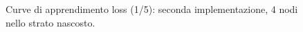 \documentclass[a4paper,12pt]{article}
\begin{document}
\begin{figure}[htb]
    \centering
    \caption{Curve di apprendimento loss (1/5): seconda implementazione, 4 nodi nello strato nascosto.}
    \label{fig6-4}
\end{figure}
\end{document}
